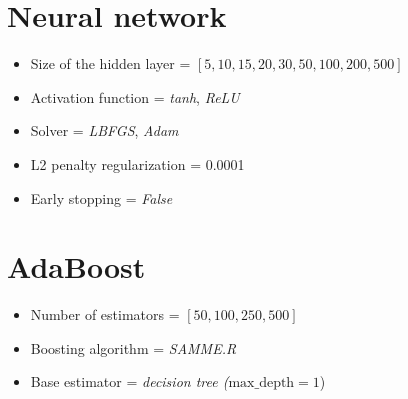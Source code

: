 \section{Neural network}

\begin{itemize}
    \item Size of the hidden layer = $[5, 10, 15, 20, 30, 50, 100, 200, 500]$
    \item Activation function = \textit{tanh}, \textit{ReLU}
    \item Solver = \textit{LBFGS}, \textit{Adam}
    \item L2 penalty regularization = 0.0001
    \item Early stopping = \textit{False}
\end{itemize}

\section{AdaBoost}

\begin{itemize}
    \item Number of estimators = $[50, 100, 250, 500]$
    \item Boosting algorithm = \textit{SAMME.R}~\cite{samme}
    \item Base estimator = \textit{decision tree ($\text{max\_depth} = 1$})
\end{itemize}

